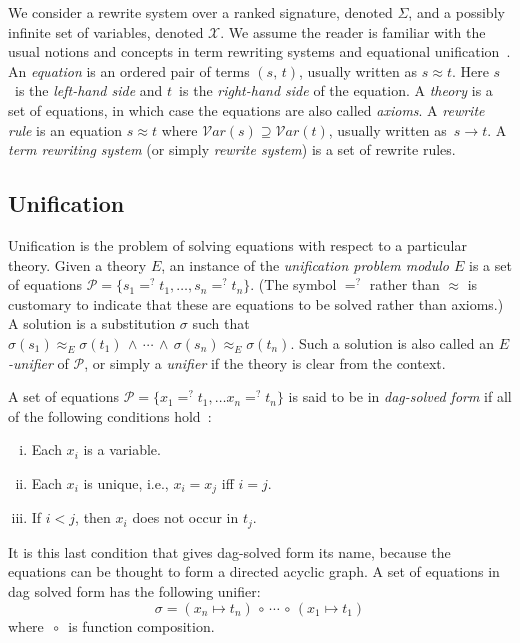 \documentclass[11pt,twoside,titlepage]{article}
\newcommand{\ueq}{=_{}^?}
\newcommand{\compcirc}{\, {\scriptstyle{\circ}} \,}
\newcommand{\X}{\mathcal{X}}
\newcommand{\p}{\mathcal{P}}
\newcommand{\Var}{\mathcal{V}\!ar}
\begin{document}
We consider a rewrite system over a ranked signature, denoted $\Sigma$, and a
possibly infinite set of variables, denoted $\X$. We assume the reader is
familiar with the usual notions and concepts in term rewriting systems and
equational unification~\cite{Term, BaaderSnyd-01}. An \emph{equation} is an
ordered pair of terms $(s, \, t)$, usually written as $s \approx t$. Here
$s$~is the \emph{le\vspace{-0.2pt}ft-hand side} and $t$~is the \emph{right-hand
side} of the equation. A \emph{theory} is a set of equations, in which case the
equations are also called \emph{axioms}. A \emph{rewrite rule} is an equation
$s \approx t$ where $\Var(s) \supseteq \Var(t)$, usually written as~$s \to t$.
A \emph{term rewriting system} (or simply \emph{rewrite system}) is a set of
rewrite rules.

\subsection{Unification}\label{subsection:unification}

Unification is the problem of solving equations with respect to a particular
theory. Given a theory $E$, an instance of the \emph{unification problem modulo
$E$} is a set of equations $\p = \{s_1 \ueq t_1, \dotsc, s_n \ueq t_n\}$. (The
symbol $\ueq$ rather than $\approx$ is customary to indicate that these are
equations to be solved rather than axioms.) A solution is a substitution
$\sigma$ such that $\sigma(s_1) \approx^{}_E \sigma(t_1) \, \wedge \, \dotsb \,
\wedge \, \sigma(s_n) \approx^{}_E \sigma(t_n)$. Such a solution is also called
an \emph{$E$-unifier} of $\p$, or simply a \emph{unifier} if the theory is
clear from the context.

A set of equations $\p = \{x_1 \ueq t_1, \dotsc x_n \ueq t_n\}$ is said to be
in \emph{dag-solved form} if all of the following conditions
hold~\cite{jouannaud1991solving}:
\begin{enumerate}[(i)]
    \item Each $x_i$ is a variable.
    \item Each $x_i$ is unique, i.e., $x_i = x_j$ iff $i = j$.
    \item If $i < j$, then $x_i$ does not occur in $t_j$.
\end{enumerate}
It is this last condition that gives dag-solved form its name, because the
equations can be thought to form a directed acyclic graph. A set of equations
in dag solved form has the following unifier:
\[\sigma = (x_n \mapsto t_n) \compcirc \dotsb \compcirc (x_1 \mapsto t_1)\]
where $\compcirc$ is function composition.
\end{document}
